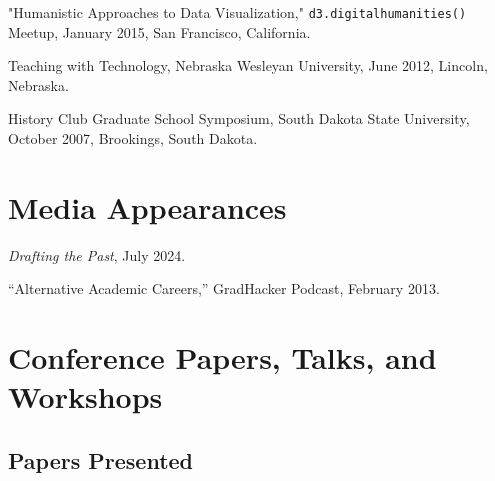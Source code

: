 \documentclass[10pt]{article}
\begin{document}
"Humanistic Approaches to Data Visualization," \texttt{d3.digitalhumanities()} Meetup, January 2015, San Francisco, California.

Teaching with Technology, Nebraska Wesleyan University, June 2012, Lincoln, Nebraska.

History Club Graduate School Symposium, South Dakota State University, October 2007, Brookings, South Dakota.

\section{Media Appearances}

\textit{Drafting the Past}, July 2024.

``Alternative Academic Careers,'' GradHacker Podcast, February 2013.

\section*{Conference Papers, Talks, and Workshops}

\subsection*{Papers Presented}
\end{document}
